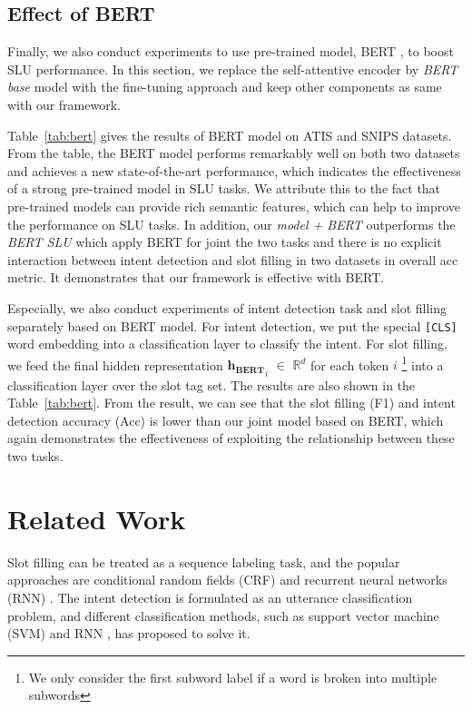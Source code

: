 \documentclass[11pt,a4paper]{article}
\begin{document}
\subsection{Effect of BERT}
Finally, we also conduct experiments to use pre-trained model, BERT \cite{devlin2018bert}, to boost SLU performance. 
In this section, we replace the self-attentive encoder by \textit{BERT base} model
with the 
fine-tuning approach and keep other components as same with our framework.

Table~\ref{tab:bert} gives the results of BERT 
model on ATIS and SNIPS datasets. From the table, the
BERT model performs remarkably well on both two
datasets and achieves a new state-of-the-art performance, which
indicates the effectiveness of a strong pre-trained model in 
SLU tasks. We attribute this to the fact that 
pre-trained models can provide rich semantic features,
which can help to improve the performance on SLU tasks.
In addition, our \textit{model + BERT} outperforms the \textit{BERT SLU} \cite{chen2019bert} which apply BERT for joint the two tasks and there is no explicit interaction between intent detection and slot filling in two datasets in overall acc metric. It demonstrates that our framework is effective with BERT. 

Especially, we also conduct experiments of intent detection task and slot filling separately based on BERT model. For intent detection,
we put the special \texttt{[CLS]} word embedding into a classification layer to classify the intent. For slot filling, we
feed the final hidden representation $\mathbf{h_{\text{BERT}}}_{i}$ $\in$ $\mathbb{R}^{d}$ for each token $i$ \footnote{We only consider the first subword label if a word is broken into multiple subwords} into a classification layer 
over the slot tag set. 
The results are also shown in the Table~\ref{tab:bert}. From the result, we can see that the slot filling 
(F1) and intent detection accuracy (Acc) is lower than our joint model based on BERT, which again demonstrates the effectiveness of exploiting the relationship between these two tasks. 

\section{Related Work}
Slot filling can be treated as a sequence labeling task, and the popular approaches are conditional random fields (CRF) \cite{raymond2007generative} and recurrent neural networks (RNN) \cite{xu2013convolutional,yao2014spoken}. 
The intent detection is formulated as an utterance classification problem,
and different classification methods, such as support vector machine (SVM) and RNN \cite{haffner2003optimizing,sarikaya2011deep},  has proposed to solve it.
\end{document}
